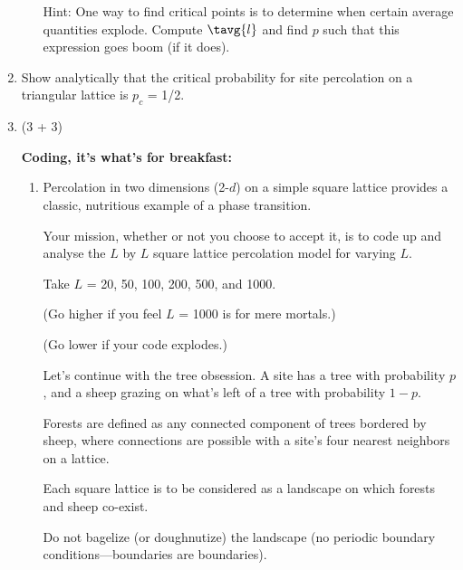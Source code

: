 \begin{enumerate}
\begin{enumerate}
    Hint: One way to find critical points is
    to determine when certain average quantities explode.
    Compute $\tavg{l}$ and find $p$ such that this
    expression goes boom (if it does).
  \end{enumerate}

  
   \solutionstart


   \solutionend

\item

  Show analytically that the critical probability for
  site percolation on a triangular lattice
  is $p_c$ = 1/2.


  
   \solutionstart


   \solutionend

\item (3 + 3)

  \textbf{Coding, it's what's for breakfast:}

  \begin{enumerate}
  \item 
    Percolation in two dimensions (2-$d$) on a simple square lattice provides a classic, nutritious 
    example of a phase transition.

    Your mission, whether or not you choose to accept it,
    is to code up and analyse the $L$ by $L$ square lattice percolation model
    for varying $L$.

    Take $L$ = 20, 50, 100, 200, 500, and 1000.
    
    (Go higher if you feel $L$ = 1000 is for mere mortals.)

    (Go lower if your code explodes.)

    Let's continue with the tree obsession.
    A site has a tree with probability $p$,
    and a sheep grazing on what's left of
    a tree with probability $1-p$.

    Forests are defined as any connected component
    of trees bordered by sheep, where connections
    are possible with a site's four nearest neighbors
    on a lattice.

    Each square lattice is to be considered as a landscape
    on which forests and sheep co-exist.

    Do not bagelize (or doughnutize) the landscape (no periodic
    boundary conditions---boundaries are boundaries).


\end{enumerate}
\end{enumerate}
